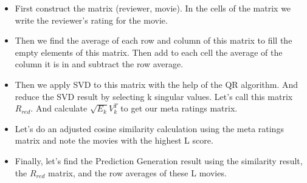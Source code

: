 \documentclass[conference]{IEEEtran}
\begin{document}
	\begin{itemize}
		\item First construct the matrix (reviewer, movie). In the cells of the matrix we write the reviewer's rating for the movie.
		\item Then we find the average of each row and column of this matrix to fill the empty elements of this matrix. Then add to each cell the average of the column it is in and subtract the row average.
		\item Then we apply SVD to this matrix with the help of the QR algorithm. And reduce the SVD result by selecting k singular values. Let's call this matrix $R_{red}$. And calculate $\sqrt{E_k}V^T_k$ to get our meta ratings matrix.
		\item  Let's do an adjusted cosine similarity calculation using the meta ratings matrix and note the movies with the highest L score.
		\item Finally, let's find the Prediction Generation result using the similarity result, the $R_{red}$ matrix, and the row averages of these L movies.
	\end{itemize}
	
\end{document}
